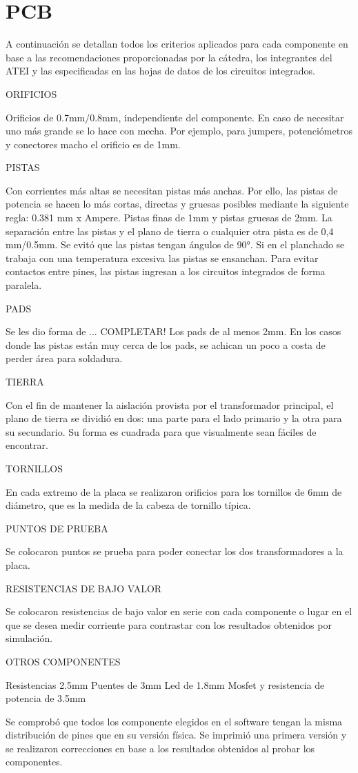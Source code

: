 \section{PCB}

A continuación se detallan todos los criterios aplicados para cada componente en base a las recomendaciones 
proporcionadas por la cátedra, los integrantes del ATEI y las especificadas en las hojas de datos de los circuitos integrados.  

ORIFICIOS

Orificios de 0.7mm/0.8mm, independiente del componente. En caso de necesitar uno más grande se lo hace con mecha.
Por ejemplo, para jumpers, potenciómetros y conectores macho el orificio es de 1mm. 

PISTAS

Con corrientes más altas se necesitan pistas más anchas. 
Por ello, las pistas de potencia se hacen lo más cortas, directas y gruesas posibles mediante la siguiente regla: 0.381 mm x Ampere.
Pistas finas de 1mm y pistas gruesas de 2mm. 
La separación entre las pistas y el plano de tierra o cualquier otra pista es de 0,4 mm/0.5mm. 
Se evitó que las pistas tengan ángulos de 90°. 
Si en el planchado se trabaja con una temperatura excesiva las pistas se ensanchan. 
Para evitar contactos entre pines, las pistas ingresan a los circuitos integrados de forma paralela. 

PADS

Se les dio forma de ... COMPLETAR!
Los pads de al menos 2mm.
En los casos donde las pistas están muy cerca de los pads, se achican un poco a costa de perder área para soldadura.  

TIERRA 

Con el fin de mantener la aislación provista por el transformador principal, 
el plano de tierra se dividió en dos: una parte para el lado primario y la otra para su secundario. 
Su forma es cuadrada para que visualmente sean fáciles de encontrar.

TORNILLOS

En cada extremo de la placa se realizaron orificios para los tornillos de 6mm de diámetro,
 que es la medida de la cabeza de tornillo típica. 

PUNTOS DE PRUEBA

Se colocaron puntos se prueba para poder conectar los dos transformadores a la placa. 

RESISTENCIAS DE BAJO VALOR 

Se colocaron resistencias de bajo valor en serie con cada componente o lugar
 en el que se desea medir corriente para contrastar con los resultados obtenidos por simulación. 

OTROS COMPONENTES 

Resistencias 2.5mm
Puentes de 3mm
Led de 1.8mm 
Mosfet y resistencia de potencia de 3.5mm

Se comprobó que todos los componente elegidos en el software tengan la misma distribución de pines que en su versión física. 
Se imprimió una primera versión y se realizaron correcciones en base a los resultados obtenidos al probar los componentes. 